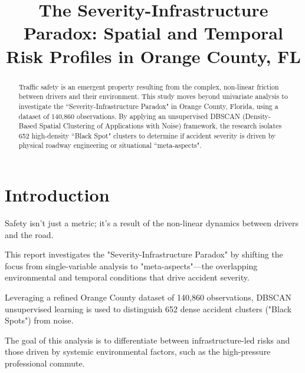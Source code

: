 \documentclass[conference]{IEEEtran}
\begin{document}
\title{The Severity-Infrastructure Paradox: Spatial and Temporal Risk Profiles in Orange County, FL}

\author{
	}

\maketitle
\renewcommand{\abstractname}{Summary}
\begin{abstract}
Traffic safety is an emergent property resulting from the complex, non-linear friction between drivers and their environment. This study moves beyond univariate analysis to investigate the ``Severity-Infrastructure Paradox" in Orange County, Florida, using a dataset of 140,860 observations. By applying an unsupervised DBSCAN (Density-Based Spatial Clustering of Applications with Noise) framework, the research isolates 652 high-density ``Black Spot" clusters to determine if accident severity is driven by physical roadway engineering or situational ``meta-aspects".
\end{abstract}

\section{\textbf{Introduction}}

Safety isn't just a metric; it's a result of the non-linear dynamics between drivers and the road.  

This report investigates the "Severity-Infrastructure Paradox" by shifting the focus from single-variable analysis to "meta-aspects"—the overlapping environmental and temporal conditions that drive accident severity.  

Leveraging a refined Orange County dataset of 140,860 observations, DBSCAN unsupervised learning is used to distinguish 652 dense accident clusters ("Black Spots") from noise.  

The goal of this analysis is to differentiate between infrastructure-led risks and those driven by systemic environmental factors, such as the high-pressure professional commute.
\end{document}
